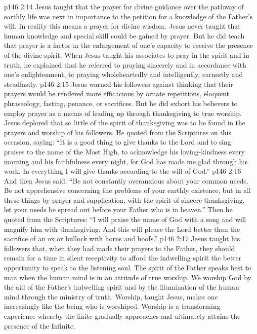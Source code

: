 \pc \vs p146 2:14 \bibnobreakspace Jesus taught that the prayer for divine guidance over the pathway of earthly life was next in importance to the petition for a knowledge of the Father’s will. In reality this means a prayer for divine wisdom. Jesus never taught that human knowledge and special skill could be gained by prayer. But he did teach that prayer is a factor in the enlargement of one’s capacity to receive the presence of the divine spirit. When Jesus taught his associates to pray in the spirit and in truth, he explained that he referred to praying sincerely and in accordance with one’s enlightenment, to praying wholeheartedly and intelligently, earnestly and steadfastly.\plusone
\pc \vs p146 2:15 \bibnobreakspace Jesus warned his followers against thinking that their prayers would be rendered more efficacious by ornate repetitions, eloquent phraseology, fasting, penance, or sacrifices. But he did exhort his believers to employ prayer as a means of leading up through thanksgiving to true worship. Jesus deplored that so little of the spirit of thanksgiving was to be found in the prayers and worship of his followers. He quoted from the Scriptures on this occasion, saying: \textcolor{ubdarkred}{“It is a good thing to give thanks to the Lord and to sing praises to the name of the Most High, to acknowledge his loving\hyp{}kindness every morning and his faithfulness every night, for God has made me glad through his work. In everything I will give thanks according to the will of God.”}\plusone
\pc \vs p146 2:16 \bibnobreakspace And then Jesus said: \textcolor{ubdarkred}{“Be not constantly overanxious about your common needs. Be not apprehensive concerning the problems of your earthly existence, but in all these things by prayer and supplication, with the spirit of sincere thanksgiving, let your needs be spread out before your Father who is in heaven.”} Then he quoted from the Scriptures: \textcolor{ubdarkred}{“I will praise the name of God with a song and will magnify him with thanksgiving. And this will please the Lord better than the sacrifice of an ox or bullock with horns and hoofs.”}
\pc \vs p146 2:17 \bibnobreakspace Jesus taught his followers that, when they had made their prayers to the Father, they should remain for a time in silent receptivity to afford the indwelling spirit the better opportunity to speak to the listening soul. The spirit of the Father speaks best to man when the human mind is in an attitude of true worship. We worship God by the aid of the Father’s indwelling spirit and by the illumination of the human mind through the ministry of truth. Worship, taught Jesus, makes one increasingly like the being who is worshiped. Worship is a transforming experience whereby the finite gradually approaches and ultimately attains the presence of the Infinite.
